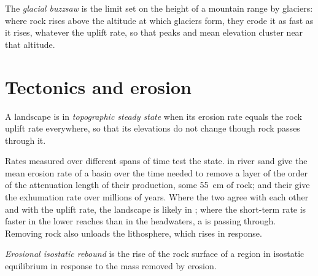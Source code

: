 \begin{definition}\label{def:b3:quantitative-geomorphology:buzzsaw}
The \emph{glacial buzzsaw} is the limit set on the
height of a mountain range by glaciers: where rock rises above the altitude
at which glaciers form, they erode it as fast as it rises, whatever the
uplift rate, so that peaks and mean elevation cluster near that altitude.
\end{definition}

\section{Tectonics and erosion}\label{sec:b3:quantitative-geomorphology:tectonics}

\begin{definition}\label{def:b3:quantitative-geomorphology:steady-state}
A landscape is in \emph{topographic steady state}
when its erosion rate equals the rock uplift rate everywhere, so
that its elevations do not change though rock passes through it.
\end{definition}

Rates measured over different spans of time test the state.  in river sand give the mean erosion rate of a basin over the time
needed to remove a layer of the order of the attenuation length of their
production, some \qty{55}{cm} of rock;  and their  give the
exhumation rate over millions of years. Where the two agree with each other
and with the uplift rate, the landscape is likely in ; where
the short-term rate is faster in the lower reaches than in the headwaters,
a  is passing through. Removing rock also unloads the
lithosphere, which rises in response.

\begin{definition}\label{def:b3:quantitative-geomorphology:rebound}
\emph{Erosional isostatic rebound} is
the rise of the rock surface of a region in isostatic equilibrium in
response to the mass removed by erosion.
\end{definition}

